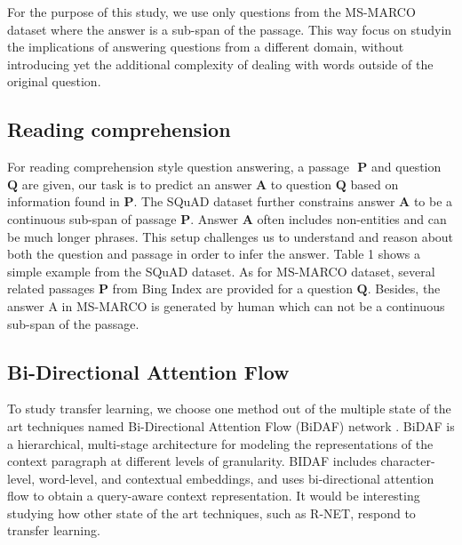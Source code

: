 \documentclass[11pt,a4paper]{article}
\begin{document}
For the purpose of this study, we use only questions from the MS-MARCO dataset where the answer is a sub-span of the passage. This way focus on studyin the implications of answering questions from a different domain, without introducing yet the additional complexity of dealing with words outside of the original question.

\subsection{Reading comprehension}
\label{ssec:reading_comprehension}

For reading comprehension style question answering, a passage $\textbf{ P}$ and question $\textbf{Q}$ are given, our task is to predict an answer $\textbf{A}$ to question $\textbf{Q}$ based on information found in $\textbf{P}$. The SQuAD dataset further constrains answer$\textbf{ A}$ to be a continuous sub-span of passage $\textbf{P}$. Answer$\textbf{ A}$ often includes non-entities and can be much longer phrases. This setup challenges us to understand and reason about both the question and passage in order to infer the answer. Table 1 shows a simple example from the SQuAD dataset. As for MS-MARCO dataset, several related passages $\textbf{P}$ from Bing Index are provided for a question $\textbf{Q}$. Besides, the answer A in MS-MARCO is generated by human which can not be a continuous sub-span of the passage. 

\subsection{Bi-Directional Attention Flow}
\label{ssec:bidaf}

To study transfer learning, we choose one method out of the multiple state of the art techniques named Bi-Directional Attention Flow (BiDAF) network  \cite{bidaf:2017}. BiDAF is a hierarchical, multi-stage architecture for modeling the representations of the context paragraph at different levels of granularity. BIDAF includes character-level, word-level, and contextual embeddings, and uses bi-directional attention flow to obtain a query-aware context representation. It would be interesting studying how other state of the art techniques, such as R-NET, respond to transfer learning.
\end{document}
